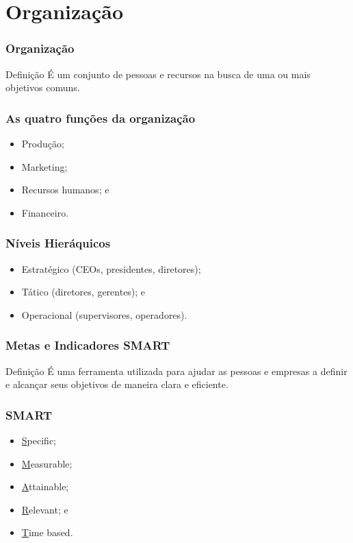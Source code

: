 \documentclass[aspectratio=169]{beamer}
\begin{document}
\section{Organiza\c cão}

\begin{frame}
	\frametitle{Organiza\c cão}

	\begin{block}{Defini\c cão}
		É um conjunto de pessoas e recursos na busca de uma ou mais objetivos comuns.
	\end{block}
\end{frame}

\begin{frame}
	\frametitle{As quatro fun\c cões da organiza\c cão}

	\begin{itemize}
		\item Produ\c cão;
		\item Marketing;
		\item Recursos humanos; e
		\item Financeiro.
	\end{itemize}
\end{frame}

\begin{frame}
	\frametitle{Níveis Hieráquicos}

	\begin{itemize}
		\item Estratégico (CEOs, presidentes, diretores);
		\item Tático (diretores, gerentes); e
		\item Operacional (supervisores, operadores).
	\end{itemize}
\end{frame}

\begin{frame}
	\frametitle{Metas e Indicadores SMART}

	\begin{block}{Defini\c cão}
		É uma ferramenta utilizada para ajudar as pessoas e empresas a definir e alcançar seus objetivos de maneira clara e eficiente.
	\end{block}
\end{frame}

\begin{frame}
	\frametitle{SMART}

	\begin{itemize}
		\item \underline{S}pecific;
		\item \underline{M}easurable;
		\item \underline{A}ttainable;
		\item \underline{R}elevant; e
		\item \underline{T}ime based.
	\end{itemize}
\end{frame}
\end{document}
